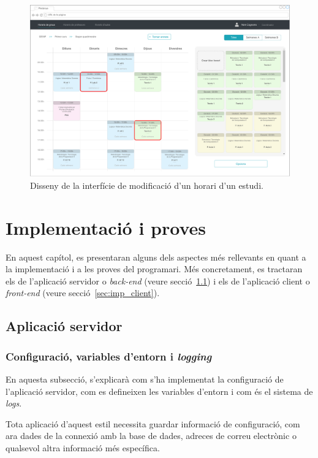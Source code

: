 \documentclass[a4paper,12pt]{ThesisStyle}
\begin{document}
\begin{figure}[H]
  \centering
  \includegraphics[width=\textwidth]{assets/interfaces/horaris/modif.pdf}
  \caption{\label{img:horaris_modif}Disseny de la interfície de modificació d'un horari d'un estudi.}
\end{figure}


\chapter{Implementació i proves}
\label{cap:implementacio}

En aquest capítol, es presentaran alguns dels aspectes més rellevants en quant a la implementació i a les proves del programari. Més concretament, es tractaran els de l'aplicació servidor o \textit{back-end} (veure secció~\ref{sec:imp_servidor}) i els de l'aplicació client o \textit{front-end} (veure secció~\ref{sec:imp_client}).

\section{Aplicació servidor}
\label{sec:imp_servidor}

\subsection{Configuració, variables d'entorn i \textit{logging}}
\label{subsec:configuracio_servidor}

En aquesta subsecció, s'explicarà com s'ha implementat la configuració de l'aplicació servidor, com es defineixen les variables d'entorn i com és el sistema de \textit{logs}.

Tota aplicació d'aquest estil necessita guardar informació de configuració, com ara dades de la connexió amb la base de dades, adreces de correu electrònic o qualsevol altra informació més específica.
\end{document}
